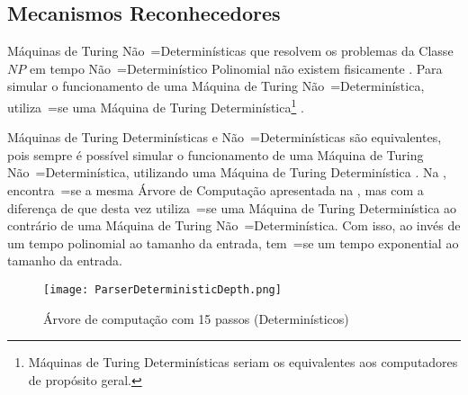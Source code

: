 {    


    \subsection{Mecanismos Reconhecedores}
    \label{section:mecanismosReconhecedores}


    Máquinas de Turing Não~=Determinísticas que resolvem os problemas da Classe $NP$ em tempo Não~=Determinístico Polinomial não existem fisicamente \cite{efficientNonDeterministicParsers}.
    Para simular o funcionamento de uma Máquina de Turing Não~=Determinística,
    utiliza~=se uma Máquina de Turing Determinística\footnote{
    Máquinas de Turing Determinísticas seriam os equivalentes aos computadores de propósito geral.
    }
    \cite{sipserBook,turingMachinesRoyer}.

    Máquinas de Turing Determinísticas e
    Não~=Determinísticas são equivalentes,
    pois sempre é possível simular o funcionamento de uma Máquina de Turing Não~=Determinística,
    utilizando uma Máquina de Turing Determinística \cite{hopcroftBook}.
    Na ,
    encontra~=se a mesma Árvore de Computação apresentada na ,
    mas com a diferença de que desta vez utiliza~=se uma Máquina de Turing Determinística ao contrário de uma Máquina de Turing Não~=Determinística.
    Com isso,
    ao invés de um tempo polinomial ao tamanho da entrada,
    tem~=se um tempo exponential ao tamanho da entrada.
    \begin{figure}[!htb]
    \caption{Árvore de computação com 15 passos (Determinísticos)}
    \label{figure:ParserDeterministic}
    \centering
    \texttt{[image: ParserDeterministicDepth.png]}
    \end{figure}

}
